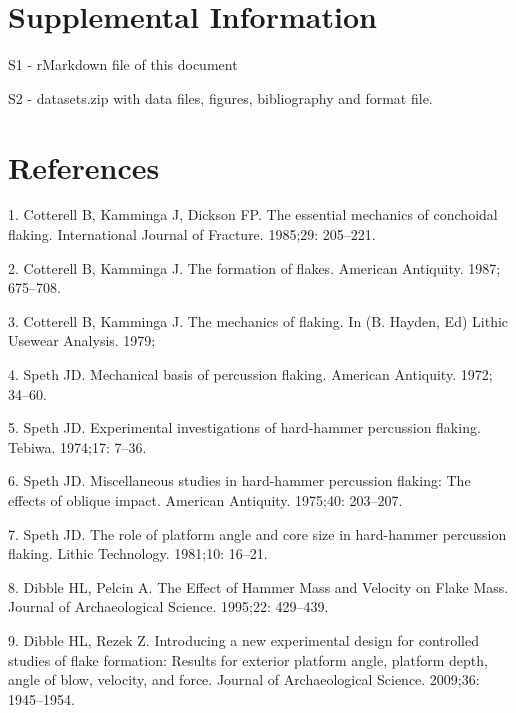 \documentclass[10pt,letterpaper]{article}
\newenvironment{cslreferences}%
  {}%
  {\par}
\begin{document}
\hypertarget{supplemental-information}{%
\section{Supplemental Information}\label{supplemental-information}}

S1 - rMarkdown file of this document

S2 - datasets.zip with data files, figures, bibliography and format
file.

\hypertarget{references}{%
\section*{References}\label{references}}

\hypertarget{refs}{}
\begin{cslreferences}
\leavevmode\hypertarget{ref-cotterell_essential_1985}{}%
1. Cotterell B, Kamminga J, Dickson FP. The essential mechanics of
conchoidal flaking. International Journal of Fracture. 1985;29:
205--221.

\leavevmode\hypertarget{ref-cotterell_formation_1987}{}%
2. Cotterell B, Kamminga J. The formation of flakes. American Antiquity.
1987; 675--708.

\leavevmode\hypertarget{ref-cotterell_mechanics_1979}{}%
3. Cotterell B, Kamminga J. The mechanics of flaking. In (B. Hayden, Ed)
Lithic Usewear Analysis. 1979;

\leavevmode\hypertarget{ref-speth_mechanical_1972}{}%
4. Speth JD. Mechanical basis of percussion flaking. American Antiquity.
1972; 34--60.

\leavevmode\hypertarget{ref-speth_experimental_1974}{}%
5. Speth JD. Experimental investigations of hard-hammer percussion
flaking. Tebiwa. 1974;17: 7--36.

\leavevmode\hypertarget{ref-speth_miscellaneous_1975}{}%
6. Speth JD. Miscellaneous studies in hard-hammer percussion flaking:
The effects of oblique impact. American Antiquity. 1975;40: 203--207.

\leavevmode\hypertarget{ref-speth_role_1981}{}%
7. Speth JD. The role of platform angle and core size in hard-hammer
percussion flaking. Lithic Technology. 1981;10: 16--21.

\leavevmode\hypertarget{ref-dibble_effect_1995}{}%
8. Dibble HL, Pelcin A. The Effect of Hammer Mass and Velocity on Flake
Mass. Journal of Archaeological Science. 1995;22: 429--439.

\leavevmode\hypertarget{ref-dibble_introducing_2009-1}{}%
9. Dibble HL, Rezek Z. Introducing a new experimental design for
controlled studies of flake formation: Results for exterior platform
angle, platform depth, angle of blow, velocity, and force. Journal of
Archaeological Science. 2009;36: 1945--1954.


\end{cslreferences}
\end{document}
